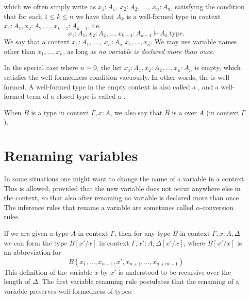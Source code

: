 which we often simply write as $x_1:A_1,~x_2:A_2,~\ldots,~x_n:A_n$,
satisfying the condition that for each $1\leq k\leq n$ we have that $A_k$ is a well-formed type in context $x_1:A_1,x_2:A_2,\ldots,x_{k-1}:A_{k-1}$, i.e.
\begin{equation*}
x_1:A_1,x_2:A_2,\ldots,x_{k-1}:A_{k-1} \vdash A_k~\textrm{type}.
\end{equation*}
We say that a context $x_1:A_1,~\ldots,~x_n:A_n$  $x_1,\ldots,x_n$. 
We may use variable names other than $x_1,\ldots,x_n$, as long as \emph{no variable is declared more than once.} 

In the special case where $n=0$, the list $x_1:A_1,x_2:A_2,\ldots,x_n:A_n$ is empty, which satisfies the well-formedness condition vacuously. In other words, the  is well-formed. A well-formed type in the empty context is also called a , and a well-formed term of a closed type is called a .

When $B$ is a type in context $\Gamma,x:A$, we also say that $B$ is a  over $A$ (in context $\Gamma$).

\section{Renaming variables}
In some situations one might want to change the name of a variable in a context. This is allowed, provided that the new variable does not occur anywhere else in the context, so that also after renaming no variable is declared more than once. 
The inference rules that rename a variable are sometimes called $\alpha$-conversion rules. 

If we are given a type $A$ in context $\Gamma$, then for any type $B$ in context $\Gamma,x:A,\Delta$ we can form the type $B[x'/x]$ in context $\Gamma,x':A,\Delta[x'/x]$, where $B[x'/x]$ is an abbreviation for
\begin{equation*}
B(x_1,\ldots,x_{n-1},x',x_{n+1},\ldots,x_{n+m-1})
\end{equation*}
This definition of  the variable $x$ by $x'$ is understood to be recursive over the length of $\Delta$. The first variable renaming rule postulates that the renaming of a variable preserves well-formedness of types:
\begin{prooftree}
\end{prooftree}


